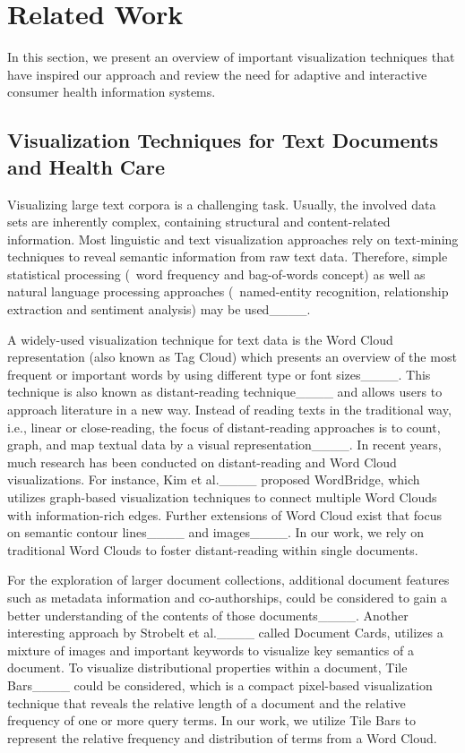 \section{Related Work}
\label{sec:related-work}

In this section, we present an overview of important visualization techniques that have inspired our approach and review the need for adaptive and interactive consumer health information systems.

\subsection{Visualization Techniques for Text Documents and Health Care}
Visualizing large text corpora is a challenging task. 
%
Usually, the involved data sets are inherently complex, containing structural and content-related information. 
%
Most linguistic and text visualization approaches rely on text-mining techniques to reveal semantic information from raw text data. 
%
Therefore, simple statistical processing (\eg\ word frequency and bag-of-words concept) as well as natural language processing approaches (\eg\ named-entity recognition, relationship extraction and sentiment analysis) may be used____.


A widely-used visualization technique for text data is the Word Cloud representation (also known as Tag Cloud) which presents an overview of the most frequent or important words by using different type or font sizes____.
%
This technique is also known as distant-reading technique____ and allows users to approach literature in a new way.
%
Instead of reading texts in the traditional way, i.e., linear or close-reading, the focus of distant-reading approaches is to count, graph, and map textual data by a visual representation____.
%
In recent years, much research has been conducted on distant-reading and Word Cloud visualizations. 
%
For instance, Kim et al.____ proposed WordBridge, which utilizes graph-based visualization techniques to connect multiple Word Clouds with information-rich edges. 
%
Further extensions of Word Cloud exist that focus on semantic contour lines____ and images____. 
%
In our work, we rely on traditional Word Clouds to foster distant-reading within single documents.


For the exploration of larger document collections, additional document features such as metadata information and co-authorships, could be considered to gain a better understanding of the contents of those documents____. 
%
Another interesting approach by Strobelt et al.____ called Document Cards, utilizes a mixture of images and important keywords to visualize key semantics of a document. 
%
To visualize distributional properties within a document, Tile Bars____ could be considered, which is a compact pixel-based visualization technique that reveals the relative length of a document and the relative frequency of one or more query terms. 
%
In our work, we utilize Tile Bars to represent the relative frequency and distribution of terms from a Word Cloud.



